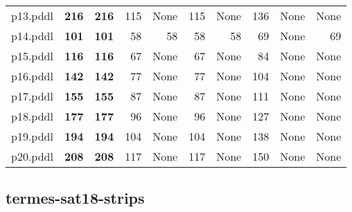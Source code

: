 \documentclass{article}
\begin{document}
\begin{tabular}{@{}lrrrrrrrrr@{}}
p13.pddl & \textbf{216} & \textbf{216} & 115 & \multicolumn{1}{|l|}{None} & 115 & \multicolumn{1}{|l|}{None} & 136 & \multicolumn{1}{|l|}{None} & \multicolumn{1}{|l|}{None} \\
p14.pddl & \textbf{101} & \textbf{101} & 58 & 58 & 58 & 58 & 69 & \multicolumn{1}{|l|}{None} & 69 \\
p15.pddl & \textbf{116} & \textbf{116} & 67 & \multicolumn{1}{|l|}{None} & 67 & \multicolumn{1}{|l|}{None} & 84 & \multicolumn{1}{|l|}{None} & \multicolumn{1}{|l|}{None} \\
p16.pddl & \textbf{142} & \textbf{142} & 77 & \multicolumn{1}{|l|}{None} & 77 & \multicolumn{1}{|l|}{None} & 104 & \multicolumn{1}{|l|}{None} & \multicolumn{1}{|l|}{None} \\
p17.pddl & \textbf{155} & \textbf{155} & 87 & \multicolumn{1}{|l|}{None} & 87 & \multicolumn{1}{|l|}{None} & 111 & \multicolumn{1}{|l|}{None} & \multicolumn{1}{|l|}{None} \\
p18.pddl & \textbf{177} & \textbf{177} & 96 & \multicolumn{1}{|l|}{None} & 96 & \multicolumn{1}{|l|}{None} & 127 & \multicolumn{1}{|l|}{None} & \multicolumn{1}{|l|}{None} \\
p19.pddl & \textbf{194} & \textbf{194} & 104 & \multicolumn{1}{|l|}{None} & 104 & \multicolumn{1}{|l|}{None} & 138 & \multicolumn{1}{|l|}{None} & \multicolumn{1}{|l|}{None} \\
p20.pddl & \textbf{208} & \textbf{208} & 117 & \multicolumn{1}{|l|}{None} & 117 & \multicolumn{1}{|l|}{None} & 150 & \multicolumn{1}{|l|}{None} & \multicolumn{1}{|l|}{None} \\
\end{tabular}

\hypertarget{initial_h_value-termes-sat18-strips}{}
\subsection*{termes-sat18-strips}
\end{document}
